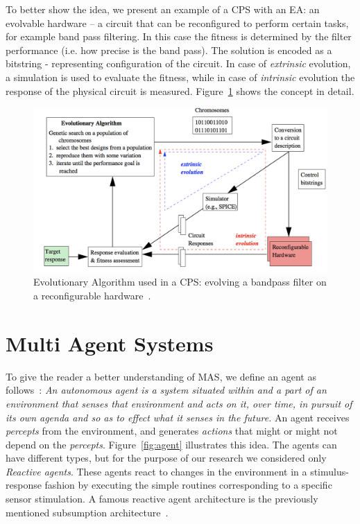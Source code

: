 To better show the idea, we present an example of a CPS with an EA: an evolvable hardware  -- a circuit that can be reconfigured to perform certain tasks, for example band pass filtering. In this case the fitness is determined by the filter performance (i.e. how precise is the band pass). The solution is encoded as a bitstring - representing configuration of the circuit. In case of \textit{extrinsic} evolution, a simulation is used to evaluate the fitness, while in case of \textit{intrinsic} evolution the response of the physical circuit is measured. Figure~\ref{fig:ea} shows the concept in detail.

\begin{figure}
\centering
\includegraphics[width=\textwidth]{Files/Figures/EHW.png}
\caption[Evolutionary Algorithm]{Evolutionary Algorithm used in a CPS: evolving a bandpass filter on a reconfigurable hardware~\cite{Greenwood2015}.}
\label{fig:ea}
\end{figure}

\section{Multi Agent Systems}
\label{sec:MAS}

To give the reader a better understanding of MAS, we define an agent as follows~\cite{Siekmann1814}:
\textit{An autonomous agent is a system situated within and a part of an environment that senses that environment and acts on it, over time, in pursuit of its own agenda and so as to effect what it senses in the future.} An agent receives \textit{percepts} from the environment, and generates \textit{actions} that might or might not depend on the \textit{percepts}. Figure~\ref{fig:agent} illustrates this idea. The agents can have different types, but for the purpose of our research we considered only \textit{Reactive agents}. These agents react to changes in the environment in a stimulus-response fashion by executing the simple routines corresponding to a specific sensor stimulation. A famous reactive agent architecture is the previously mentioned subsumption architecture~\cite{Siekmann1814}.

